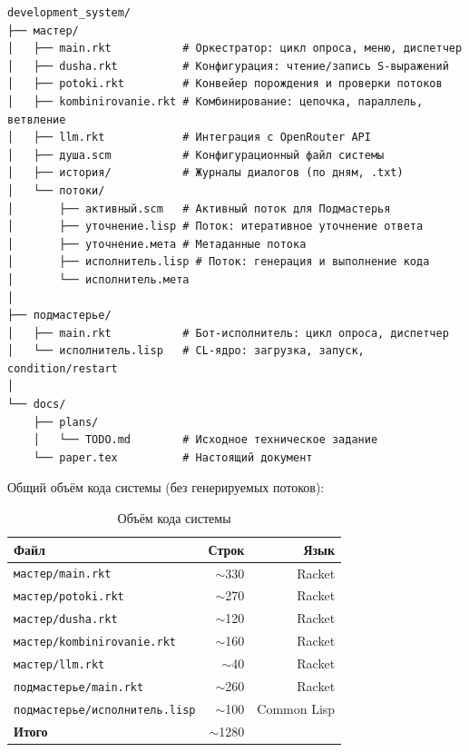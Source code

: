 \documentclass[11pt,a4paper]{article}
\newcommand{\devs}{\texttt{development\allowbreak\_\allowbreak system}}
\begin{document}
\begin{lstlisting}[basicstyle=\ttfamily\footnotesize, numbers=none,
                   caption={Полная структура каталогов \devs}]
development_system/
├── мастер/
│   ├── main.rkt           # Оркестратор: цикл опроса, меню, диспетчер
│   ├── dusha.rkt          # Конфигурация: чтение/запись S-выражений
│   ├── potoki.rkt         # Конвейер порождения и проверки потоков
│   ├── kombinirovanie.rkt # Комбинирование: цепочка, параллель, ветвление
│   ├── llm.rkt            # Интеграция с OpenRouter API
│   ├── душа.scm           # Конфигурационный файл системы
│   ├── история/           # Журналы диалогов (по дням, .txt)
│   └── потоки/
│       ├── активный.scm   # Активный поток для Подмастерья
│       ├── уточнение.lisp # Поток: итеративное уточнение ответа
│       ├── уточнение.мета # Метаданные потока
│       ├── исполнитель.lisp # Поток: генерация и выполнение кода
│       └── исполнитель.мета
│
├── подмастерье/
│   ├── main.rkt           # Бот-исполнитель: цикл опроса, диспетчер
│   └── исполнитель.lisp   # CL-ядро: загрузка, запуск, condition/restart
│
└── docs/
    ├── plans/
    │   └── TODO.md        # Исходное техническое задание
    └── paper.tex          # Настоящий документ
\end{lstlisting}

Общий объём кода системы (без генерируемых потоков):

\begin{table}[H]
\centering
\begin{tabular}{lrr}
\toprule
\textbf{Файл} & \textbf{Строк} & \textbf{Язык} \\
\midrule
\texttt{мастер/main.rkt}           & $\sim$330 & Racket \\
\texttt{мастер/potoki.rkt}         & $\sim$270 & Racket \\
\texttt{мастер/dusha.rkt}          & $\sim$120 & Racket \\
\texttt{мастер/kombinirovanie.rkt} & $\sim$160 & Racket \\
\texttt{мастер/llm.rkt}            & $\sim$40  & Racket \\
\texttt{подмастерье/main.rkt}      & $\sim$260 & Racket \\
\texttt{подмастерье/исполнитель.lisp} & $\sim$100 & Common Lisp \\
\midrule
\textbf{Итого}                     & $\sim$1280 & \\
\bottomrule
\end{tabular}
\caption{Объём кода системы}
\end{table}
\end{document}
